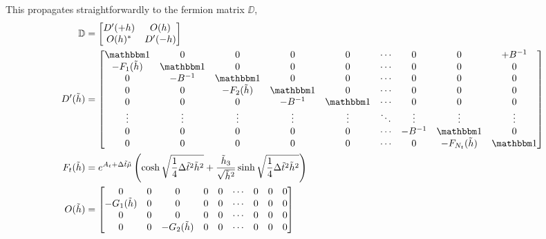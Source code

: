 This propagates straightforwardly to the fermion matrix $\DD$,
\begin{align}
    \DD &= \begin{bmatrix} D'(+h) & O(h) \\ O(h)\conjugate & D'(-h) \end{bmatrix}
    \\
    D'(\tilde{h}) &=
	\begin{bmatrix} 
	\one            & 0         & 0                 & 0         & 0      & \cdots & 0       & 0                     & +B^{-1}
\\	-F_1(\tilde{h}) & \one      & 0                 & 0         & 0      & \cdots & 0       & 0                     & 0
\\	0               & -B^{-1}   & \one              & 0         & 0      & \cdots & 0       & 0                     & 0
\\	0               & 0         & -F_2(\tilde{h})   & \one      & 0      & \cdots & 0       & 0                     & 0
\\	0               & 0         & 0                 & -B^{-1}   & \one   & \cdots & 0       & 0                     & 0
\\	\vdots          & \vdots    & \vdots            & \vdots    & \vdots & \ddots & \vdots  & \vdots                & \vdots
\\	0               & 0         & 0                 & 0         & 0      & \cdots & -B^{-1} & \one                  & 0
\\	0               & 0         & 0                 & 0         & 0      & \cdots & 0       & -F_{N_t}(\tilde{h})   & \one
	\end{bmatrix}
	\label{eq:D prime with h}
	\\
	F_t(\tilde{h}) &= e^{A_t + \Delta\tilde{t}\tilde{\mu}} \left(\cosh \sqrt{\oneover{4}\Delta\tilde{t}^2 \tilde{h}^2} + \frac{\tilde{h}_3}{\sqrt{\tilde{h}^2}} \sinh\sqrt{\oneover{4}\Delta\tilde{t}^2 \tilde{h}^2}\right)
    \\
    O(\tilde{h}) &=
	\begin{bmatrix} 
	0               & 0         & 0                 & 0         & 0      & \cdots & 0       & 0                    & 0
\\	-G_1(\tilde{h}) & 0         & 0                 & 0         & 0      & \cdots & 0       & 0                    & 0
\\	0               & 0         & 0                 & 0         & 0      & \cdots & 0       & 0                    & 0
\\	0               & 0         & -G_2(\tilde{h})   & 0         & 0      & \cdots & 0       & 0                    & 0

\end{bmatrix}
\end{align}
